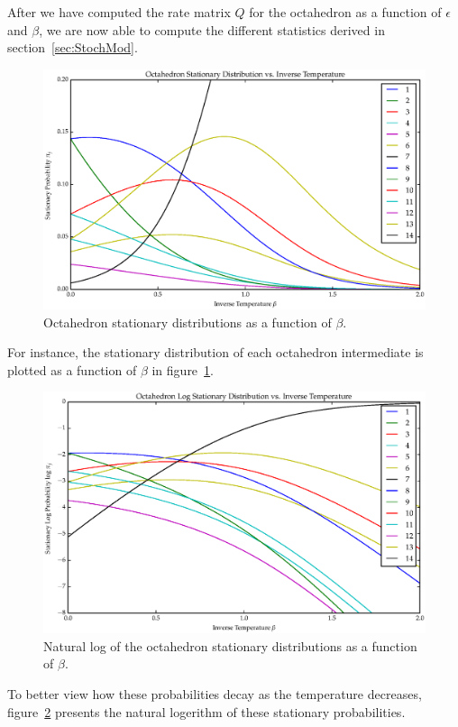 After we have computed the rate matrix $Q$ for the octahedron as a function of $\epsilon$ and $\beta$, we are now able to compute the different statistics derived in section~\ref{sec:StochMod}. 
\begin{figure}[ht]
\label{fig:OctaPi}
\centering
  \includegraphics[scale=0.6]{images/octahedron_pi.eps}
\caption{Octahedron stationary distributions as a function of $\beta$.}
\end{figure}
For instance, the stationary distribution of each octahedron intermediate is plotted as a function of $\beta$ in figure~\ref{fig:OctaPi}.
\begin{figure}[ht]
\label{fig:OctaLogPi}
\centering
  \includegraphics[scale=0.6]{images/octahedron_log_pi.eps}
\caption{Natural log of the octahedron stationary distributions as a function of $\beta$.}
\end{figure}
To better view how these probabilities decay as the temperature decreases, figure~\ref{fig:OctaLogPi} presents the natural logerithm of these stationary probabilities.

